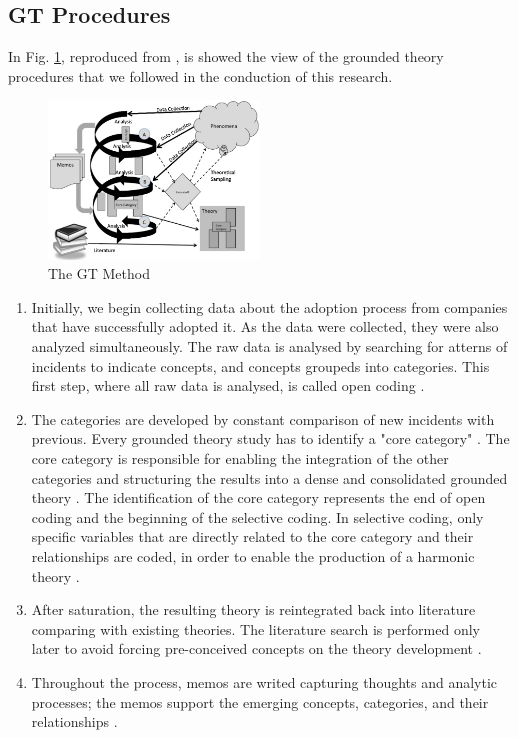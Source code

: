 \subsection{GT Procedures}

In Fig. \ref{fig1}, reproduced from \cite{adolph2011using}, is showed the view
of the grounded theory procedures that we followed in the conduction of this
research.

\begin{figure}[htpb]
  \centering
  \includegraphics[width=0.5\textwidth,natwidth=821,natheight=617]{GT.png}
  \caption{The GT Method \cite{adolph2011using}}
  \label{fig1}
\end{figure}

\begin{enumerate}[label=(\Alph*)]
\item Initially, we begin collecting data about the adoption process from
companies that have successfully adopted it. As the data were collected, they
were also analyzed simultaneously. The raw data is analysed by searching for
atterns of incidents to indicate concepts, and concepts groupeds into
categories. This first step, where all raw data is analysed, is called open
coding \cite{stol2016grounded}.

\item The categories are developed by constant comparison of new incidents with
previous. Every grounded theory study has to identify a "core category"
\cite{stol2016grounded}. The core category is responsible for enabling the
integration of the other categories and structuring the results into a dense
and consolidated grounded theory \cite{jantunen2014using}. The identification
of the core category represents the end of open coding and the beginning of the
selective coding. In selective coding, only specific variables that are
directly related to the core category and their relationships are coded, in
order to enable the production of a harmonic theory \cite{coleman2007using}
\cite{hoda2011impact}.

\item After saturation, the resulting theory is reintegrated back into
literature comparing with existing theories. The literature search is performed
only later to avoid forcing pre-conceived concepts on the theory development
\cite{adolph2012reconciling}.

\item Throughout the process, memos are writed capturing thoughts and analytic
processes; the memos support the emerging concepts, categories, and their
relationships \cite{adolph2012reconciling}.

\end{enumerate}

